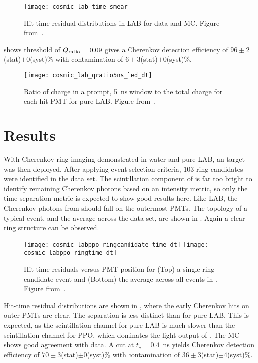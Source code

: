 \begin{figure}
	\centering
	\texttt{[image: cosmic\_lab\_time\_smear]}
	\caption{Hit-time residual distributions in LAB for data and MC. Figure from~\cite{chess_lab}.}
	\label{fig:lab}
\end{figure}

 shows threshold of $Q_{\rm ratio}=0.09$ gives a Cherenkov detection efficiency of $96\pm2$(stat)$\pm0$(syst)\% with contamination of $6\pm3$(stat)$\pm0$(syst)\%.

\begin{figure}
	\centering
	\texttt{[image: cosmic\_lab\_qratio5ns\_led\_dt]}
	\caption{Ratio of charge in a prompt, 5~ns window to the total charge for each hit PMT  for pure LAB. Figure from~\cite{chess_lab}.}
	\label{f:labQ}
\end{figure}

\clearpage

\section{{\labppo} Results}
\label{sec:labppo}

With Cherenkov ring imaging demonstrated in water and pure LAB, an {\labppo} target was then deployed.
After applying event selection criteria, $103$ ring candidates were identified in the {\labppo} data set. 
The scintillation component of {\labppo} is far too bright to identify remaining Cherenkov photons based on an intensity metric, so only the time separation metric is expected to show good results here.
Like LAB, the Cherenkov photons from {\labppo} should fall on the outermost PMTs.
The topology of a typical event, and the average across the data set, are shown in .  Again a clear ring structure can be observed. 
\begin{figure}
	\centering
	\texttt{[image: cosmic\_labppo\_ringcandidate\_time\_dt]}
	\texttt{[image: cosmic\_labppo\_ringtime\_dt]}	
	\caption{Hit-time residuals versus PMT position for (Top) a single ring candidate event and (Bottom) the average across all events in {\labppo}. Figure from~\cite{chess_lab}.}
	\label{fig:labppo_ring}
\end{figure}
Hit-time residual distributions are shown in , where the early Cherenkov hits on outer PMTs are clear. 
The separation is less distinct than for pure LAB.
This is expected, as the scintillation channel for pure LAB is much slower than the scintillation channel for PPO, which dominates the light output of {\labppo}.
The MC shows good agreement with data.  
A cut at $ t_c = 0.4$~ns yields Cherenkov detection efficiency of $70 \pm 3 $(stat)$\pm0$(syst)\% with contamination of $36 \pm 3 $(stat)$\pm4$(syst)\%. 


